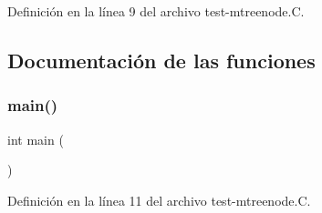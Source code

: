 Definición en la línea 9 del archivo test-\/mtreenode.\+C.



\subsection{Documentación de las funciones}
\mbox{\label{test-mtreenode_8_c_ae66f6b31b5ad750f1fe042a706a4e3d4}} 
\subsubsection{\texorpdfstring{main()}{main()}}
{\footnotesize\ttfamily int main (\begin{DoxyParamCaption}{ }\end{DoxyParamCaption})}



Definición en la línea 11 del archivo test-\/mtreenode.\+C.

